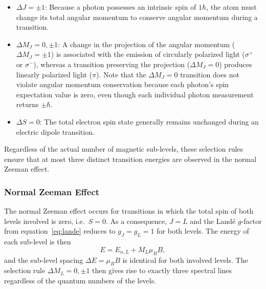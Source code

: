 \documentclass{article}
\begin{document}
\begin{itemize}
    \item $\Delta J = \pm 1$: Because a photon possesses an intrinsic spin of $1\hbar$, the atom must change its total angular momentum to conserve angular momentum during a transition.
    \item $\Delta M_J = 0, \pm 1$: A change in the projection of the angular momentum ($\Delta M_J = \pm 1$) is associated with the emission of circularly polarized light ($\sigma^+$ or $\sigma^-$), whereas a transition preserving the projection ($\Delta M_J = 0$) produces linearly polarized light ($\pi$). Note that the $\Delta M_J = 0$ transition does not violate angular momentum conservation because each photon's spin expectation value is zero, even though each individual photon measurement returns $\pm\hbar$.
    \item $\Delta S = 0$: The total electron spin state generally remains unchanged during an electric dipole transition.
\end{itemize}

Regardless of the actual number of magnetic sub-levels, these selection rules ensure that at most three distinct transition energies are observed in the normal Zeeman effect.

\subsubsection{Normal Zeeman Effect}

The normal Zeeman effect occurs for transitions in which the total spin of both levels involved is zero, i.e.\ $S = 0$. As a consequence, $J = L$ and the Landé $g$-factor from equation~\eqref{eq:lande} reduces to $g_J = g_L = 1$ for both levels. The energy of each sub-level is then
\begin{equation}
    E = E_{n,L} + M_L\mu_BB,
\end{equation}
and the sub-level spacing $\Delta E = \mu_B B$ is identical for both involved levels. The selection rule $\Delta M_L = 0, \pm 1$ then gives rise to exactly three spectral lines regardless of the quantum numbers of the levels.
\end{document}
